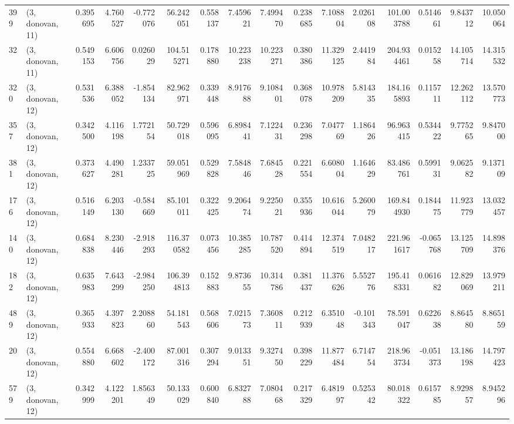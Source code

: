 \begin{tabular}{llrrrrrrrrrrrrrr}
399 &  (3, donovan, 11) &   0.395695 &   4.760527 &  -0.772076 &    56.242051 &   0.558137 &   7.459621 &   7.499470 &  0.238685 &   7.108804 &   2.026108 &    101.003788 &   0.514661 &   9.843712 &   10.050064 \\
32  &  (3, donovan, 11) &   0.549153 &   6.606756 &   0.026029 &   104.515271 &   0.178880 &  10.223238 &  10.223271 &  0.380386 &  11.329125 &   2.441984 &    204.934461 &   0.015258 &  14.105714 &   14.315532 \\
320 &  (3, donovan, 12) &   0.531536 &   6.388052 &  -1.854134 &    82.962971 &   0.339448 &   8.917688 &   9.108401 &  0.368078 &  10.978209 &   5.814335 &    184.165893 &   0.115711 &  12.262112 &   13.570773 \\
357 &  (3, donovan, 12) &   0.342500 &   4.116198 &   1.772154 &    50.729018 &   0.596095 &   6.898441 &   7.122431 &  0.236298 &   7.047769 &   1.186426 &     96.963415 &   0.534422 &   9.775265 &    9.847000 \\
381 &  (3, donovan, 12) &   0.373627 &   4.490281 &   1.233725 &    59.051969 &   0.529828 &   7.584846 &   7.684528 &  0.221554 &   6.608004 &   1.164629 &     83.486761 &   0.599131 &   9.062582 &    9.137109 \\
176 &  (3, donovan, 12) &   0.516149 &   6.203130 &  -0.584669 &    85.101011 &   0.322425 &   9.206474 &   9.225021 &  0.355936 &  10.616044 &   5.260079 &    169.844930 &   0.184475 &  11.923779 &   13.032457 \\
140 &  (3, donovan, 12) &   0.684838 &   8.230446 &  -2.918293 &   116.370582 &   0.073456 &  10.385285 &  10.787520 &  0.414894 &  12.374519 &   7.048217 &    221.961617 &  -0.065768 &  13.125709 &   14.898376 \\
182 &  (3, donovan, 12) &   0.635983 &   7.643299 &  -2.984250 &   106.394813 &   0.152883 &   9.873655 &  10.314786 &  0.381437 &  11.376626 &   5.552776 &    195.418331 &   0.061682 &  12.829069 &   13.979211 \\
489 &  (3, donovan, 12) &   0.365933 &   4.397823 &   2.208860 &    54.181543 &   0.568606 &   7.021573 &   7.360811 &  0.212939 &   6.351048 &  -0.101343 &     78.591047 &   0.622638 &   8.864580 &    8.865159 \\
20  &  (3, donovan, 12) &   0.554880 &   6.668602 &  -2.400172 &    87.001316 &   0.307294 &   9.013351 &   9.327450 &  0.398229 &  11.877484 &   6.714754 &    218.963734 &  -0.051373 &  13.186198 &   14.797423 \\
579 &  (3, donovan, 12) &   0.342999 &   4.122201 &   1.856349 &    50.133029 &   0.600840 &   6.832788 &   7.080468 &  0.217329 &   6.481997 &   0.525342 &     80.018322 &   0.615785 &   8.929857 &    8.945296 \\

\end{tabular}
